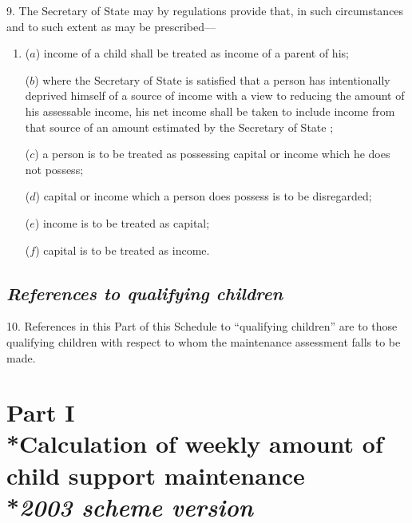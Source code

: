 \documentclass[12pt,a4paper]{article}
\begin{document}
9. The Secretary of State may by regulations provide that, in such circumstances and to such extent as may be prescribed—
\begin{enumerate}\item[]
($a$) income of a child shall be treated as income of a parent of his;

($b$) where 
the Secretary of State  %
is satisfied that a person has intentionally deprived himself of a source of income with a view to reducing the amount of his assessable income, his net income shall be taken to include income from that source of an amount estimated by 
the Secretary of State%
;

($c$) a person is to be treated as possessing capital or income which he does not possess;

($d$) capital or income which a person does possess is to be disregarded;

($e$) income is to be treated as capital;

($f$) capital is to be treated as income.
\end{enumerate}


\subsection*{\itshape References to qualifying children}

10. References in this Part of this Schedule to “qualifying children” are to those qualifying children with respect to whom the maintenance assessment falls to be made.


\section[Part I --- Calculation of weekly amount of child support maintenance --- \emph{2003 scheme version}]{Part I\\*Calculation of weekly amount of child support maintenance\\*\emph{2003 scheme version}}
\end{document}
